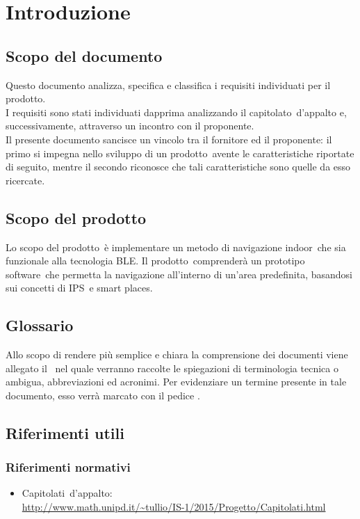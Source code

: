 \documentclass[../AnalisiDeiRequisiti.tex]{subfiles}
\begin{document}
\section{Introduzione}
	\subsection{Scopo del documento}
	Questo documento analizza, specifica e classifica i requisiti individuati per il prodotto\g.\\
	I requisiti sono stati individuati dapprima analizzando il capitolato\g\ d’appalto e, successivamente, attraverso un incontro con il proponente.\\
	Il presente documento sancisce un vincolo tra il fornitore ed il proponente: il primo si impegna nello sviluppo di un prodotto\g\ avente le caratteristiche riportate di seguito, mentre il secondo 				riconosce che tali caratteristiche sono quelle da esso ricercate.

	\subsection{Scopo del prodotto}
	Lo scopo del prodotto\g\ è implementare un metodo di navigazione indoor\g\ che sia funzionale alla tecnologia BLE\g. Il prodotto\g\ 
comprenderà un prototipo software\g\ che permetta la navigazione all’interno di un’area predefinita, basandosi sui concetti di IPS\g\ e smart places\g.
	
	\subsection{Glossario} 
	Allo scopo di rendere più semplice e chiara la comprensione dei documenti viene allegato il \glossariov\ nel quale verranno raccolte le spiegazioni di  terminologia tecnica o  ambigua,
abbreviazioni ed acronimi. Per evidenziare un termine presente in tale documento, esso verrà marcato con il pedice \g.
	
	\subsection{Riferimenti utili}
		\subsubsection{Riferimenti normativi}
		\begin{itemize}
			\item Capitolati\g\ d'appalto: \\\url{http://www.math.unipd.it/~tullio/IS-1/2015/Progetto/Capitolati.html}
		\end{itemize}
\end{document}
